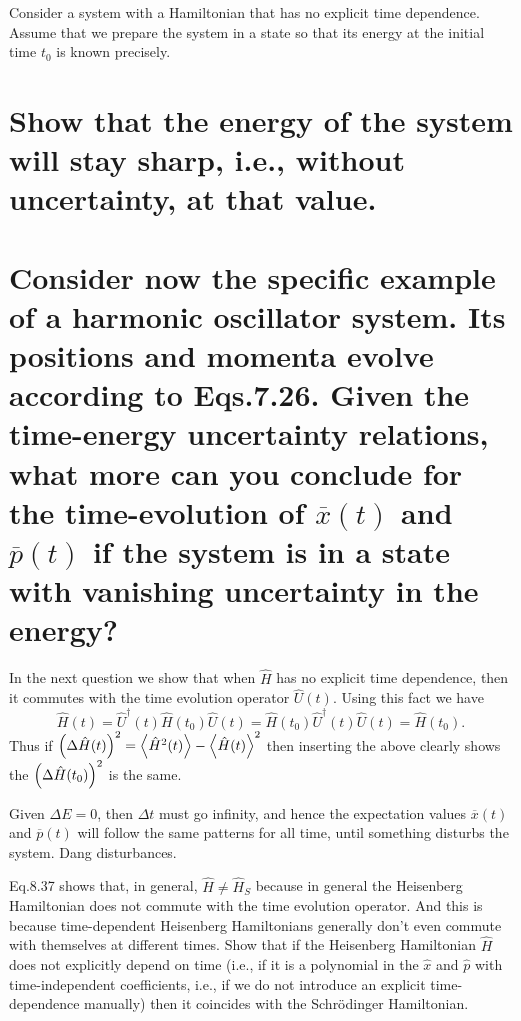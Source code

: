 \documentclass[boxes,pages]{homework}
\makeatletter
\newcommand{\herm}[1]{{{#1}^\dagger}}
\numberwithin{@problem}{section}
\makeatother
\begin{document}
\begin{problem}
Consider a system with a Hamiltonian that has no explicit time dependence. Assume that we prepare the system in a state so that its energy at the initial time $t_0$ is known precisely.
\begin{parts}
	\part{Show that the energy of the system will stay sharp, i.e., without uncertainty, at that value.}\label{part:4a}
	\part{Consider now the specific example of a harmonic oscillator system. Its positions and momenta evolve according to Eqs.7.26. Given the time-energy uncertainty relations, what more can you conclude for the time-evolution of $\overline{x}(t)$ and $\overline{p}(t)$ if the system is in a state with vanishing uncertainty in the energy?}\label{part:4b}
\end{parts}
\end{problem}

\begin{solution}
	\ref{part:4a}
	In the next question we show that when $\hat{H}$ has no explicit time dependence, then it commutes with the time evolution operator $\hat{U}(t)$. Using this fact we have
	\begin{equation*}
		\hat{H}(t) = \herm{\hat{U}}(t)\hat{H}(t_0)\hat{U}(t) = \hat{H}(t_0)\herm{\hat{U}}(t)\hat{U}(t) = \hat{H}(t_0).
	\end{equation*}
	Thus if $\qty(\Delta\hat{H}(t))^2 = \expval{\hat{H}^2(t)} - \expval{\hat{H}(t)}^2$ then inserting the above clearly shows the $\qty(\Delta\hat{H}(t_0))^2$ is the same.

	\ref{part:4b}
	Given $\Delta E = 0$, then $\Delta t$ must go infinity, and hence the expectation values $\overline{x}(t)$ and $\overline{p}(t)$ will follow the same patterns for all time, until something disturbs the system. Dang disturbances.
\end{solution}

\begin{problem}
Eq.8.37 shows that, in general, $\hat{H} \neq \hat{H}_S$ because in general the Heisenberg Hamiltonian does not commute with the time evolution operator. And this is because time-dependent Heisenberg Hamiltonians generally don’t even commute with themselves at different times. Show that if the Heisenberg Hamiltonian $\hat{H}$ does not explicitly depend on time (i.e., if it is a polynomial in the $\hat{x}$ and $\hat{p}$ with time-independent coefficients, i.e., if we do not introduce an explicit time-dependence manually) then it coincides with the Schr\"{o}dinger Hamiltonian.
\end{problem}
\end{document}
